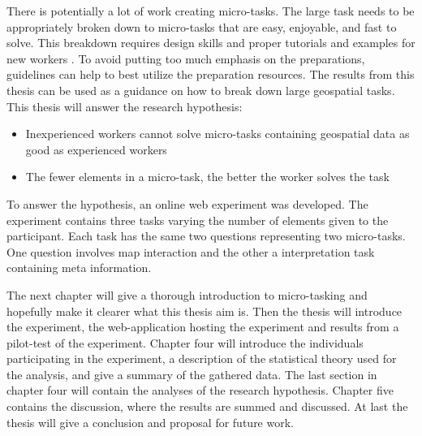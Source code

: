 There is potentially a lot of work creating micro-tasks. The large task needs to be appropriately broken down to micro-tasks that are easy, enjoyable, and fast to solve. This breakdown requires design skills and proper tutorials and examples for new workers \citep{Schulze2012}. 
To avoid putting too much emphasis on the preparations, guidelines can help to best utilize the preparation resources. The results from this thesis can be used as a guidance on how to break down large geospatial tasks. \\

This thesis will answer the research hypothesis: 
\begin{itemize}
	\item Inexperienced workers cannot solve micro-tasks containing geospatial data as good as experienced workers
	\item The fewer elements in a micro-task, the better the worker solves the task
\end{itemize}
\vspace{0.3cm}
To answer the hypothesis, an online web experiment was developed. The experiment contains three tasks varying the number of elements given to the participant. Each task has the same two questions representing two micro-tasks. One question involves map interaction and the other a interpretation task containing meta information. 

The next chapter will give a thorough introduction to micro-tasking and hopefully make it clearer what this thesis aim is. Then the thesis will introduce the experiment, the web-application hosting the experiment and results from a pilot-test of the experiment. Chapter four will introduce the individuals participating in the experiment, a description of the statistical theory used for the analysis, and give a summary of the gathered data. The last section in chapter four will contain the analyses of the research hypothesis. Chapter five contains the discussion, where the results are summed and discussed. At last the thesis will give a conclusion and proposal for future work.
 
 
